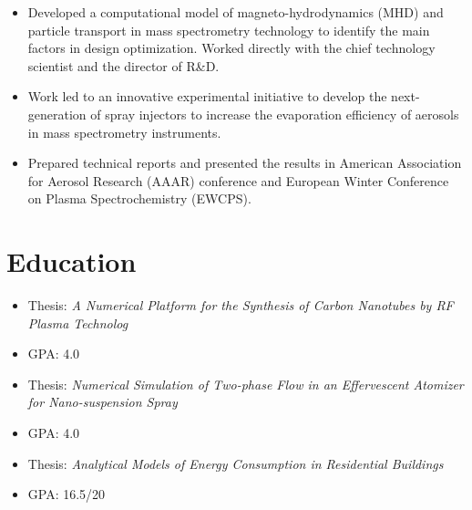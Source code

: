\documentclass[11pt,a4paper,sans]{moderncv}
\begin{document}
{ \begin{itemize} \itemsep -1pt
  \item Developed a computational model of magneto-hydrodynamics (MHD) and particle transport in mass spectrometry technology to identify the main factors in design optimization. Worked directly with the chief technology scientist and the director of R\&D.
  \item Work led to an innovative experimental initiative to develop the next-generation of spray injectors
to increase the evaporation efficiency of aerosols in mass spectrometry instruments.
  \item Prepared technical reports and presented the results in American Association for Aerosol Research (AAAR) conference and European Winter Conference on Plasma Spectrochemistry (EWCPS).
\end{itemize} }

\section{\textbf{Education}}

{ \begin{itemize} \itemsep -1pt
  \item Thesis: \textit{A Numerical Platform for the Synthesis of Carbon Nanotubes by RF Plasma Technolog}\item GPA: 4.0
\end{itemize} }

{ \begin{itemize} \itemsep -1pt
  \item Thesis: \textit{Numerical Simulation of Two-phase Flow in an Effervescent Atomizer for Nano-suspension Spray}\item GPA: 4.0
\end{itemize} }

{ \begin{itemize} \itemsep -1pt
  \item Thesis: \textit{Analytical Models of Energy Consumption in Residential Buildings}
  \item GPA: 16.5/20
\end{itemize} }
\end{document}
